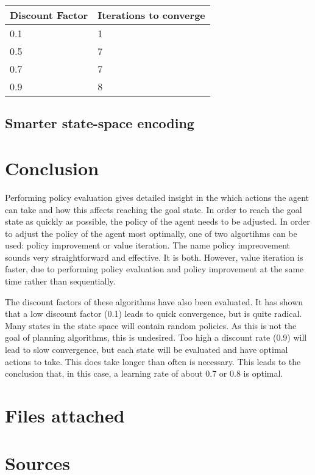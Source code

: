 \documentclass{article}
\begin{document}
\begin{center}
	\begin{tabular}{ l || l }
		Discount Factor & Iterations to converge \\ 
		\hline
		0.1 & 1 \\
		0.5 & 7 \\
		0.7 & 7 \\
		0.9 & 8 \\	
	\end{tabular}
\end{center}

\subsection*{Smarter state-space encoding}


\section*{Conclusion}
Performing policy evaluation gives detailed insight in the which actions the agent can take and how this affects reaching the goal state. In order to reach the goal state as quickly as possible, the policy of the agent needs to be adjusted. In order to adjust the policy of the agent most optimally, one of two algortihms can be used: policy improvement or value iteration. The name policy impreovement sounds very straightforward and effective. It is both. However, value iteration is faster, due to performing policy evaluation and policy improvement at the same time rather than sequentially.

The discount factors of these algorithms have also been evaluated. It has shown that a low discount factor (0.1) leads to quick convergence, but is quite radical. Many states in the state space will contain random policies. As this is not the goal of planning algorithms, this is undesired. Too high a discount rate (0.9) will lead to slow convergence, but each state will be evaluated and have optimal actions to take. This does take longer than often is necessary. This leads to the conclusion that, in this case, a learning rate of about 0.7 or 0.8 is optimal.

\section*{Files attached}

\section*{Sources}


\begin{comment}
\begin{itemize}
	\item Barto and Sutton (http://webdocs.cs.ualberta.ca/~sutton/book/the-book.html)
\end{comment}
\end{document}
